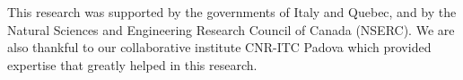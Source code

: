 \documentclass[]{spie}  %
\begin{document}







\acknowledgments %
 
This research was supported by the governments of Italy and Quebec, and by the Natural
Sciences and Engineering Research Council of Canada (NSERC). We are also thankful to
our collaborative institute CNR-ITC Padova which provided expertise that greatly helped
in this research. 

\end{document}
